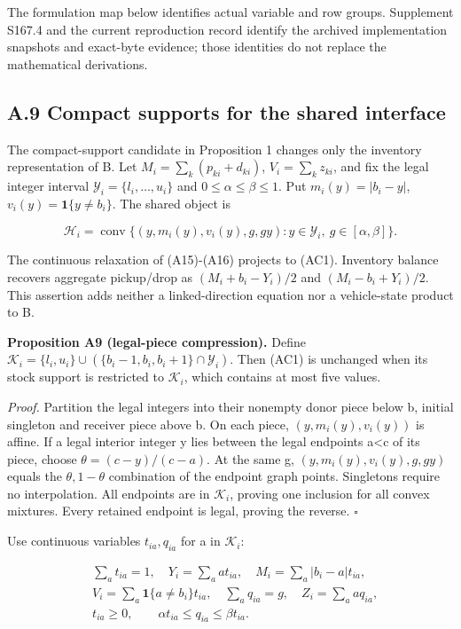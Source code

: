 \documentclass[
  american,
  11pt,
]{article}
\newcounter{none} %
\begin{document}
The formulation map below identifies actual variable and row groups.
Supplement S167.4 and the current reproduction record identify the
archived implementation snapshots and exact-byte evidence; those
identities do not replace the mathematical derivations.

\clearpage

\subsection{A.9 Compact supports for the shared
interface}\label{a.9-compact-supports-for-the-shared-interface}

The compact-support candidate in Proposition 1 changes only the
inventory representation of B. Let \(M_i=\sum_k(p_{ki}+d_{ki})\),
\(V_i=\sum_kz_{ki}\), and fix the legal integer interval
\(\mathcal Y_i=\{l_i,\ldots,u_i\}\) and \(0\le\alpha\le\beta\le1\). Put
\(m_i(y)=|b_i-y|\), \(v_i(y)=\mathbf1\{y\ne b_i\}\). The shared object
is

\[
\mathcal H_i=\operatorname{conv}\{(y,m_i(y),v_i(y),g,gy):y\in\mathcal Y_i,\ g\in[\alpha,\beta]\}.
\tag{AC1}
\]

The continuous relaxation of (A15)-(A16) projects to (AC1). Inventory
balance recovers aggregate pickup/drop as \((M_i+b_i-Y_i)/2\) and
\((M_i-b_i+Y_i)/2\). This assertion adds neither a linked-direction
equation nor a vehicle-state product to B.


\textbf{Proposition A9 (legal-piece compression).} Define
\(\mathcal K_i=\{l_i,u_i\}\cup(\{b_i-1,b_i,b_i+1\}\cap\mathcal Y_i)\).
Then (AC1) is unchanged when its stock support is restricted to
\(\mathcal K_i\), which contains at most five values.

\emph{Proof.} Partition the legal integers into their nonempty donor
piece below b, initial singleton and receiver piece above b. On each
piece, \((y,m_i(y),v_i(y))\) is affine. If a legal interior integer y
lies between the legal endpoints a\textless c of its piece, choose
\(\theta=(c-y)/(c-a)\). At the same g, \((y,m_i(y),v_i(y),g,gy)\) equals
the \(\theta,1-\theta\) combination of the endpoint graph points.
Singletons require no interpolation. All endpoints are in
\(\mathcal K_i\), proving one inclusion for all convex mixtures. Every
retained endpoint is legal, proving the reverse. \(\square\)

Use continuous variables \(t_{ia},q_{ia}\) for a in \(\mathcal K_i\):

\[
\begin{aligned}
&\sum_a t_{ia}=1,\quad Y_i=\sum_a a t_{ia},\quad
M_i=\sum_a|b_i-a|t_{ia},\\
&V_i=\sum_a\mathbf1\{a\ne b_i\}t_{ia},\quad
\sum_a q_{ia}=g,\quad Z_i=\sum_a a q_{ia},\\
&t_{ia}\ge0,\qquad\alpha t_{ia}\le q_{ia}\le\beta t_{ia}.
\end{aligned}
\tag{AC2}
\]
\end{document}
